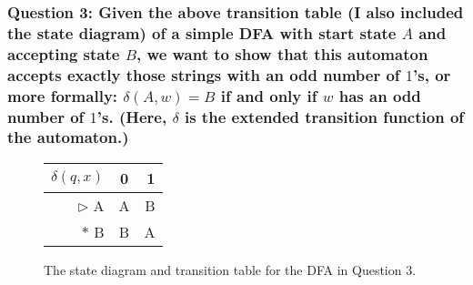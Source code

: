 \subsubsection*{Question 3: Given the above transition table (I also included the state diagram) of a simple DFA with start state $A$ and accepting state $B$, we want to show that this automaton accepts exactly those strings with an odd number of $1$'s, or more formally: $\delta(A, w) = B$ if and only if $w$ has an odd number of $1$'s. (Here, $\delta$ is the extended transition function of the automaton.)}
\begin{figure}[ht]
\centering
\setlength\tabcolsep{10pt}
\begin{minipage}{0.48\textwidth}
\centering
\begin{tabular}{r | c | r}
$\delta(q, x)$ & 0 & 1 \\
\hline
$\rhd$ A      & A & B \\
$\ast$ B      & B & A \\
\end{tabular}
\label{tab:ttable3}
\end{minipage}
\begin{minipage}{0.48\textwidth}
\centering
{}
\end{minipage}
\caption{} The state diagram and transition table for the DFA in Question 3.
\end{figure}

